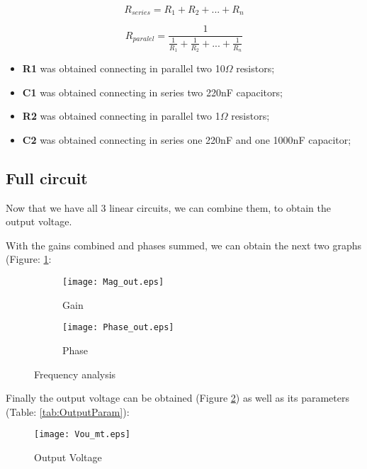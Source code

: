 \begin{equation}
    R_{series}= R_1+R_2+...+R_n
\end{equation}

\begin{equation}
    R_{paralel}= \frac{1}{\frac{1}{R_1}+\frac{1}{R_2}+...+\frac{1}{R_n}}
\end{equation}

\begin{itemize}
    \item \textbf{R1} was obtained connecting in parallel two 10$\Omega$ resistors;
    \item \textbf{C1} was obtained connecting in series two 220nF capacitors;
    \item \textbf{R2} was obtained connecting in parallel two 1$\Omega$ resistors;
\item \textbf{C2} was obtained connecting in series one 220nF and one 1000nF capacitor;
\end{itemize}

\subsection{Full circuit}

\indent

Now that we have all 3 linear circuits, we can combine them, to obtain the output voltage.

With the gains combined and phases summed, we can obtain the next two graphs (Figure: \ref{fig:FreqA}:

\begin{figure}[H]
\centering
\begin{subfigure}{.49\textwidth}
  \centering
  \texttt{[image: Mag\_out.eps]}%
  \caption{Gain}
\end{subfigure}%
\begin{subfigure}{.49\textwidth}
  \centering
  \texttt{[image: Phase\_out.eps]}%
  \caption{Phase}
\end{subfigure}
\caption{Frequency analysis}
\label{fig:FreqA}
\end{figure}


Finally the output voltage can be obtained (Figure \ref{fig:VoltOut}) as well as its parameters (Table: \ref{tab:OutputParam}):

\begin{figure}[H]
    \centering
    \texttt{[image: Vou\_mt.eps]}
    \caption{Output Voltage}
    \label{fig:VoltOut}
\end{figure}


